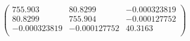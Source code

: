 \documentclass{article}
\begin{document}
\[\left(
\begin{array}{ccc}
 755.903 & 80.8299 & -0.000323819 \\
 80.8299 & 755.904 & -0.000127752 \\
 -0.000323819 & -0.000127752 & 40.3163 \\
\end{array}
\right)\]
\end{document}
